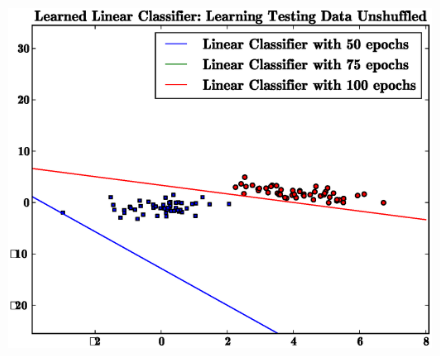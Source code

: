 \documentclass[letterpaper,10pt,titlepage]{article}
\begin{document}
\begin{figure}[th!]
\centering
\includegraphics[width=5in]{test_data_unshuffled.eps} 
\end{figure} 
\pagebreak
\\[15mm]
\end{document}
